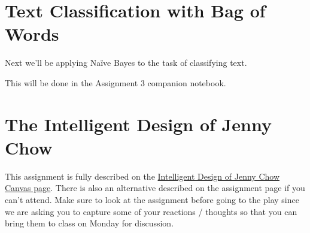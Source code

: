 \documentclass[assignment03_Solutions]{subfiles}
\begin{document}
\section{Text Classification with Bag of Words}
Next we'll be applying Na\"ive Bayes to the task of classifying text.

\begin{externalresources}[(45 minutes)]
This will be done in the Assignment 3 companion notebook.
\end{externalresources}

\section{The Intelligent Design of Jenny Chow}

This assignment is fully described on the \href{https://canvas.instructure.com/courses/1659968/assignments/12785465?module_item_id=26196347}{Intelligent Design of Jenny Chow Canvas page}.  There is also an alternative described on the assignment page if you can't attend.  Make sure to look at the assignment before going to the play since we are asking you to capture some of your reactions / thoughts so that you can bring them to class on Monday for discussion.
\end{document}
